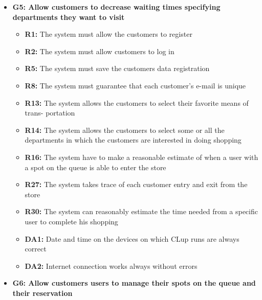 \documentclass{article}
\begin{document}
\begin{itemize}
\begin{itemize}
				
				\end{itemize}

\item {\bfseries G5: Allow customers to decrease waiting times specifying departments they want to visit}	

			\begin{itemize}
				\item {\bfseries R1:} The system must allow the customers to register
				\item {\bfseries R2:} The system must allow customers to log in
				\item {\bfseries R5:} The system must save the customers data registration
				\item {\bfseries R8:} The system must guarantee that each customer's e-mail is unique

				\item {\bfseries R13:} The system allows the customers to select their favorite means of trans-
portation
				\item {\bfseries R14:} The system allows the customers to select some or all the departments in
which the customers are interested in doing shopping
				\item {\bfseries R16:} The system have to make a reasonable estimate of when a user with a spot
on the queue is able to enter the store
				\item {\bfseries R27:} The system takes trace of each customer entry and exit from the store
				\item {\bfseries R30:} The system can reasonably estimate the time needed from a specific user
to complete his shopping


				\item {\bfseries DA1:} Date and time on the devices on which CLup runs are always correct
				\item {\bfseries DA2:} Internet connection works always without errors
				
				
				\end{itemize}

\item {\bfseries G6: Allow customers users to manage their spots on the queue and their reservation}	


\end{itemize}
\end{document}
